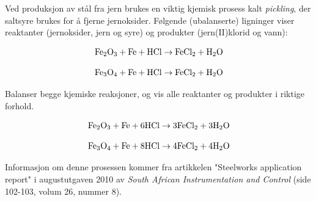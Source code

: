 
Ved produksjon av stål fra jern brukes en viktig kjemisk prosess kalt {\it pickling}, der saltsyre brukes for å fjerne jernoksider. Følgende (ubalanserte) ligninger viser reaktanter (jernoksider, jern og syre) og produkter (jern(II)klorid og vann):

$$\hbox{Fe}_2\hbox{O}_3 + \hbox{Fe} + \hbox{HCl} \to \hbox{FeCl}_2 + \hbox{H}_2\hbox{O}$$

$$\hbox{Fe}_3\hbox{O}_4 + \hbox{Fe} + \hbox{HCl} \to \hbox{FeCl}_2 + \hbox{H}_2\hbox{O}$$

Balanser begge kjemiske reaksjoner, og vis alle reaktanter og produkter i riktige forhold.







$$\hbox{Fe}_2\hbox{O}_3 + \hbox{Fe} + 6\hbox{HCl} \to 3\hbox{FeCl}_2 + 3\hbox{H}_2\hbox{O}$$

$$\hbox{Fe}_3\hbox{O}_4 + \hbox{Fe} + 8\hbox{HCl} \to 4\hbox{FeCl}_2 + 4\hbox{H}_2\hbox{O}$$







Informasjon om denne prosessen kommer fra artikkelen "Steelworks application report" i augustutgaven 2010 av {\it South African Instrumentation and Control} (side 102-103, volum 26, nummer 8).


